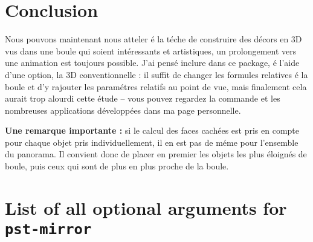 \documentclass[11pt,frenchb,BCOR10mm,DIV12,bibliography=totoc,parskip=false,smallheadings
    headexclude,footexclude,oneside]{pst-doc}
\begin{document}
\section{Conclusion}
Nous pouvons maintenant nous atteler é la téche de construire des
décors en 3D vus dans une boule qui soient intéressants et
artistiques, un prolongement vers une animation est toujours possible.
J'ai pensé inclure dans ce package, é l'aide d'une option,
la 3D conventionnelle : il suffit de changer les formules
relatives é la boule et d'y rajouter les paramétres relatifs au
point de vue, mais finalement cela aurait trop alourdi cette
étude -- vous pouvez regardez la commande  et les
nombreuses applications développées dans ma page personnelle.

\textbf{Une remarque importante :} si le calcul des faces cachées
est pris en compte pour chaque objet pris individuellement, il en
est pas de méme pour l'ensemble du panorama. Il convient donc de
placer en premier les objets les plus éloignés de boule, puis ceux
qui sont de plus en plus proche de la boule.


\section{List of all optional arguments for \texttt{pst-mirror}}



\bgroup
\nocite{*}
\raggedright


\egroup

\printindex
\end{document}
